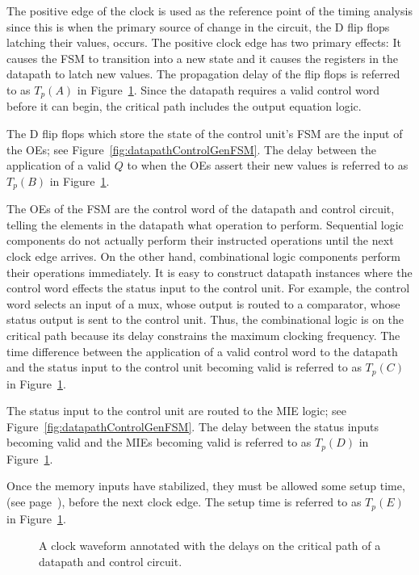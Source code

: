 The positive edge of the clock is used as the reference point
of the timing analysis since this is when the primary source of change
in the circuit, the D flip flops latching their values, occurs.
The positive clock edge has two primary effects: It causes the
FSM to transition into a new state and it causes the registers in
the datapath to latch new values.  The propagation delay of the
flip flops is referred to as $T_p(A)$ in Figure~\ref{fig:datapathControlDPTime}.  Since
the datapath requires a valid control word before it can begin,
the critical path includes the output equation logic.

The D flip flops which store the state of the control unit's FSM
are the input of the OEs; see Figure~\ref{fig:datapathControlGenFSM}.  The delay
between the application of a valid $Q$ to when the OEs assert their new
values is referred to as $T_p(B)$ in Figure~\ref{fig:datapathControlDPTime}.

The OEs of the FSM are the control word of the datapath and
control circuit, telling the elements in the datapath what operation
to perform.  Sequential logic components do not actually
perform their instructed operations until the next clock edge
arrives.  On the other hand, combinational logic components
perform their operations immediately.  It is easy to construct
datapath instances where the control word effects the status
input to the control unit.  For example, the control word
selects an input of a mux, whose output is routed to a comparator,
whose status output is sent to the control unit.  Thus, the
combinational logic is on the critical path because its delay
constrains the maximum clocking frequency.  The time difference
between the application of a valid control word to the datapath
and the status input to the control unit becoming valid is referred
to as $T_p(C)$ in Figure~\ref{fig:datapathControlDPTime}.

The status input to the control unit are routed to the MIE logic;
see Figure~\ref{fig:datapathControlGenFSM}.  The delay between the status inputs
becoming valid and the MIEs becoming valid is referred to as $T_p(D)$
in Figure~\ref{fig:datapathControlDPTime}.

Once the memory inputs have stabilized, they must be allowed
some setup time, (see page~\pageref{page:setup}), before the next
clock edge.  The setup time is referred to as $T_p(E)$ in
Figure~\ref{fig:datapathControlDPTime}.

\begin{figure}[ht]
    \caption{A clock waveform annotated with the delays on the
    critical path of a datapath and control circuit.}
    \label{fig:datapathControlDPTime}
\end{figure}

